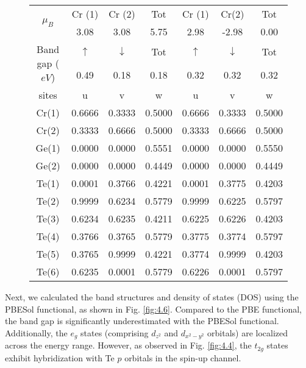 \begin{figure}[H]
\begin{minipage}[b]{.55\linewidth}
{\begin{tabular}{ccccccc}
	\midrule
	\multirow{2}{*}{$\mu_{B}$}        & Cr (1)    & Cr (2)       & Tot   &   Cr (1)     & Cr(2)       & Tot    \\
	&  3.08     & 3.08         & 5.75  &   2.98       &  -2.98      &  0.00     \\ 
	\midrule
	\multirow{2}{*}{Band gap ($eV$)}  & $\uparrow$& $\downarrow$ & Tot   &   $\uparrow$ &$\downarrow$ & Tot    \\
	&  0.49     & 0.18         &  0.18 &   0.32       &  0.32       &  0.32 \\ 
	\midrule                                                              
	sites  & u      & v      & w       &   u    &    v    &     w    \\
	Cr(1)  & 0.6666 & 0.3333 & 0.5000  & 0.6666 &  0.3333 & 0.5000   \\
	Cr(2)  & 0.3333 & 0.6666 & 0.5000  & 0.3333 &  0.6666 & 0.5000   \\
	Ge(1)  & 0.0000 & 0.0000 & 0.5551  & 0.0000 &  0.0000 & 0.5550   \\ 
	Ge(2)  & 0.0000 & 0.0000 & 0.4449  & 0.0000 &  0.0000 & 0.4449   \\
	Te(1)  & 0.0001 & 0.3766 & 0.4221  & 0.0001 &  0.3775 & 0.4203   \\
	Te(2)  & 0.9999 & 0.6234 & 0.5779  & 0.9999 &  0.6225 & 0.5797   \\
	Te(3)  & 0.6234 & 0.6235 & 0.4211  & 0.6225 &  0.6226 & 0.4203   \\
	Te(4)  & 0.3766 & 0.3765 & 0.5779  & 0.3775 &  0.3774 & 0.5797   \\
	Te(5)  & 0.3765 & 0.9999 & 0.4221  & 0.3774 &  0.9999 & 0.4203   \\
	Te(6)  & 0.6235 & 0.0001 & 0.5779  & 0.6226 &  0.0001 & 0.5797   \\
	\bottomrule
	\bottomrule
\end{tabular}
		}
	\end{minipage}
\end{figure}

Next, we calculated the band structures and density of states (DOS) using the PBESol functional, as shown in Fig. \ref{fig:4.6}. Compared to the PBE functional, the band gap is significantly underestimated with the PBESol functional. Additionally, the $e_g$ states (comprising $d_{z^2}$ and $d_{x^2-y^2}$ orbitals) are localized across the energy range. However, as observed in Fig. \ref{fig:4.4}, the $t_{2g}$ states exhibit hybridization with Te $p$ orbitals in the spin-up channel.

